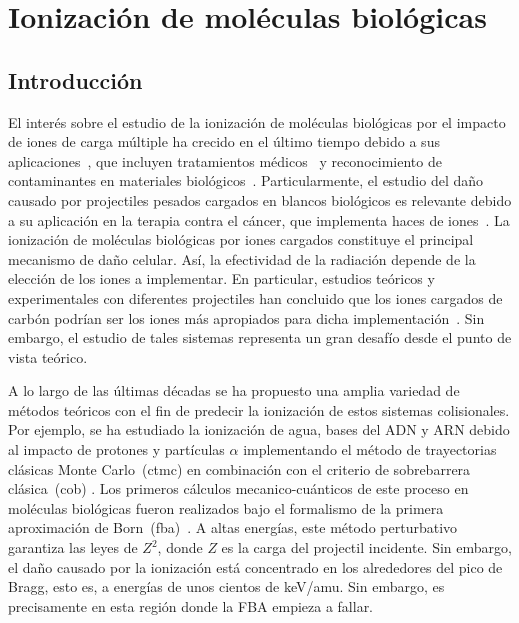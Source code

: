 \chapter{Ionización de moléculas biológicas}

\section{Introducción}

El interés sobre el estudio de la ionización de moléculas biológicas por 
el impacto de iones de carga múltiple ha crecido en el último tiempo 
debido a sus aplicaciones~\cite{Liamsuwan:13}, que incluyen tratamientos 
médicos~\cite{Mohamad:17,Baskar:12,Denifl:11,Solov:09} y reconocimiento 
de contaminantes en materiales biológicos~\cite{Gafur:18,FerrazDias:13}. 
Particularmente, el estudio del daño causado por projectiles pesados 
cargados en blancos biológicos es relevante debido a su aplicación en la 
terapia contra el cáncer, que implementa haces de iones~\cite{Baskar:12}. 
La ionización de moléculas biológicas por iones cargados constituye el 
principal mecanismo de daño celular. Así, la efectividad de la radiación 
depende de la elección de los iones a implementar. En particular, 
estudios teóricos y experimentales con diferentes projectiles han 
concluido que los iones cargados de carbón podrían ser los iones más 
apropiados para dicha implementación~\cite{Mohamad:17}. Sin embargo, el 
estudio de tales sistemas representa un gran desafío desde el punto de 
vista teórico. 

A lo largo de las últimas décadas se ha propuesto una amplia variedad de 
métodos teóricos con el fin de predecir la ionización de estos sistemas 
colisionales. Por ejemplo, se ha estudiado la ionización de agua, bases 
del ADN y ARN debido al impacto de protones y partículas $\alpha$ 
implementando el método de trayectorias clásicas Monte Carlo~(\acs{ctmc}) 
en combinación con el criterio de sobrebarrera clásica~(\acs{cob}) 
\cite{Abbas:08,Lekadir:09}. Los primeros cálculos mecanico-cuánticos de 
este proceso en moléculas biológicas fueron realizados bajo el formalismo 
de la primera aproximación de Born~(\acs{fba})~\cite{DalCappello:08,
Champion:10}. A altas energías, este método perturbativo garantiza las 
leyes de $Z^2$, donde $Z$ es la carga del projectil incidente. Sin 
embargo, el daño causado por la ionización está concentrado en los 
alrededores del pico de Bragg, esto es, a energías de unos cientos de 
keV/amu. Sin embargo, es precisamente en esta región donde la FBA empieza 
a fallar. 

